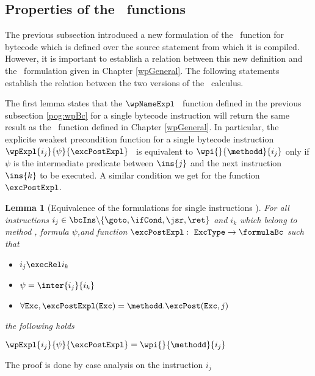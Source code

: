 \newtheorem{wpIns}{Lemma}[subsection]
\newtheorem{wpBlock}[wpIns]{Lemma}
\newtheorem{relWpExpr}[wpIns]{Lemma}
\newtheorem{relWpStmt}[wpIns]{Lemma}

\subsection{Properties of the \wpName \ functions}\label{pog:wpBcProp}
    The previous subsection introduced a new formulation of the 
    \wpName \ function for bytecode which is defined over
    the source statement from which it is compiled. 
    However, it is important to establish a relation between this new definition
    and  the \wpName \ formulation given in  Chapter \ref{wpGeneral}.
    The following statements establish the relation between 
    the two versions of the \wpName \  calculus.


The first lemma states that the $\wpNameExpl$ \ function defined in the previous subsection \ref{pog:wpBc}
 for a single bytecode instruction
 will return the same result as the \fwpi \ function defined in Chapter \ref{wpGeneral}.  In particular, the explicite
 weakest precondition function for a single bytecode instruction 
  $\wpExpl{ i_j}{ \psi  }{ \excPostExpl} $ \ is equivalent to $\wpi{}{\methodd}{i_j}$ only if 
$\psi$  is the intermediate predicate between $\ins{j}$ and the next instruction $\ins{k}$ to be executed. A similar condition we get for the function
 $\excPostExpl$.

\begin{wpIns}[Equivalence of the formulations for single instructions ]\label{wpIns}
For all instructions  
 $i_j  \in \bcIns \backslash \{ \goto , \ifCond, \jsr, \ret \}$ and  $i_k$ which belong to method \methodd,  formula
 $\psi$,and  function $\excPostExpl : \mbox{ \rm \texttt{ExcType}}  \rightarrow \formulaBc $ such that
\begin{itemize}
   \item  $i_j \execRel i_k$
   \item  $\psi = \inter{i_j}{i_k}$  
   \item  $\forall \mbox{\rm\texttt{Exc}} ,  \excPostExpl( \mbox{\rm\texttt{Exc}} ) = \methodd.\excPost(\mbox{\rm\texttt{Exc}}, j ) $ 
\end{itemize}

the following holds 

   $\wpExpl{ i_j}{ \psi  }{ \excPostExpl} = \wpi{}{\methodd}{i_j} $
\end{wpIns}
The proof is done by case analysis on the instruction $i_j$\\


